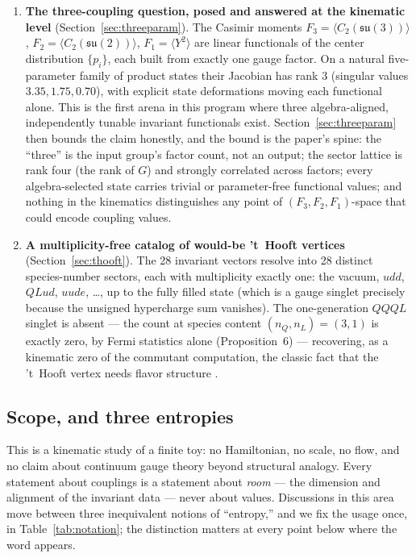 \documentclass[11pt]{article}
\newcommand{\su}[1]{\mathfrak{su}(#1)}
\begin{document}
\begin{enumerate}
\item \textbf{The three-coupling question, posed and answered at the kinematic level} (Section~\ref{sec:threeparam}). The Casimir moments $F_3 = \langle C_2(\su3)\rangle$, $F_2 = \langle C_2(\su2)\rangle$, $F_1 = \langle Y^2\rangle$ are linear functionals of the center distribution $\{p_i\}$, each built from exactly one gauge factor. On a natural five-parameter family of product states their Jacobian has rank 3 (singular values $3.35, 1.75, 0.70$), with explicit state deformations moving each functional alone. This is the first arena in this program where three algebra-aligned, independently tunable invariant functionals exist. Section~\ref{sec:threeparam} then bounds the claim honestly, and the bound is the paper's spine: the ``three'' is the input group's factor count, not an output; the sector lattice is rank four (the rank of $G$) and strongly correlated across factors; every algebra-selected state carries trivial or parameter-free functional values; and nothing in the kinematics distinguishes any point of $(F_3,F_2,F_1)$-space that could encode coupling values.

\item \textbf{A multiplicity-free catalog of would-be 't~Hooft vertices} (Section~\ref{sec:thooft}). The 28 invariant vectors resolve into 28 distinct species-number sectors, each with multiplicity exactly one: the vacuum, $udd$, $QLud$, $uude$, \ldots, up to the fully filled state (which is a gauge singlet precisely because the unsigned hypercharge sum vanishes). The one-generation $QQQL$ singlet is absent --- the count at species content $(n_Q,n_L)=(3,1)$ is exactly zero, by Fermi statistics alone (Proposition~6) --- recovering, as a kinematic zero of the commutant computation, the classic fact that the 't~Hooft vertex needs flavor structure \cite{thooft}.

\end{enumerate}

\subsection{Scope, and three entropies}\label{sec:notation}

This is a kinematic study of a finite toy: no Hamiltonian, no scale, no flow, and no claim about continuum gauge theory beyond structural analogy. Every statement about couplings is a statement about \emph{room} --- the dimension and alignment of the invariant data --- never about values. Discussions in this area move between three inequivalent notions of ``entropy,'' and we fix the usage once, in Table~\ref{tab:notation}; the distinction matters at every point below where the word appears.
\end{document}
